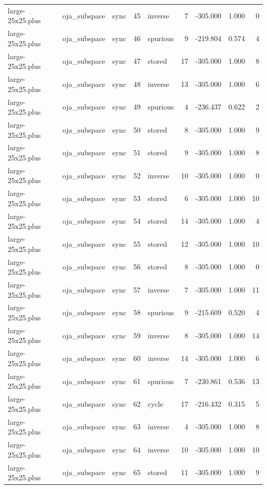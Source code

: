 \begin{tabular}{lllrlrrrr}
large-25x25.plus & oja\_subspace & sync & 45 & inverse & 7 & -305.000 & 1.000 & 0 \\
large-25x25.plus & oja\_subspace & sync & 46 & spurious & 9 & -219.804 & 0.574 & 4 \\
large-25x25.plus & oja\_subspace & sync & 47 & stored & 17 & -305.000 & 1.000 & 8 \\
large-25x25.plus & oja\_subspace & sync & 48 & inverse & 13 & -305.000 & 1.000 & 6 \\
large-25x25.plus & oja\_subspace & sync & 49 & spurious & 4 & -236.437 & 0.622 & 2 \\
large-25x25.plus & oja\_subspace & sync & 50 & stored & 8 & -305.000 & 1.000 & 9 \\
large-25x25.plus & oja\_subspace & sync & 51 & stored & 9 & -305.000 & 1.000 & 8 \\
large-25x25.plus & oja\_subspace & sync & 52 & inverse & 10 & -305.000 & 1.000 & 0 \\
large-25x25.plus & oja\_subspace & sync & 53 & stored & 6 & -305.000 & 1.000 & 10 \\
large-25x25.plus & oja\_subspace & sync & 54 & stored & 14 & -305.000 & 1.000 & 4 \\
large-25x25.plus & oja\_subspace & sync & 55 & stored & 12 & -305.000 & 1.000 & 10 \\
large-25x25.plus & oja\_subspace & sync & 56 & stored & 8 & -305.000 & 1.000 & 0 \\
large-25x25.plus & oja\_subspace & sync & 57 & inverse & 7 & -305.000 & 1.000 & 11 \\
large-25x25.plus & oja\_subspace & sync & 58 & spurious & 9 & -215.609 & 0.520 & 4 \\
large-25x25.plus & oja\_subspace & sync & 59 & inverse & 8 & -305.000 & 1.000 & 14 \\
large-25x25.plus & oja\_subspace & sync & 60 & inverse & 14 & -305.000 & 1.000 & 6 \\
large-25x25.plus & oja\_subspace & sync & 61 & spurious & 7 & -230.861 & 0.536 & 13 \\
large-25x25.plus & oja\_subspace & sync & 62 & cycle & 17 & -216.432 & 0.315 & 5 \\
large-25x25.plus & oja\_subspace & sync & 63 & inverse & 4 & -305.000 & 1.000 & 8 \\
large-25x25.plus & oja\_subspace & sync & 64 & inverse & 10 & -305.000 & 1.000 & 10 \\
large-25x25.plus & oja\_subspace & sync & 65 & stored & 11 & -305.000 & 1.000 & 9 \\

\end{tabular}
